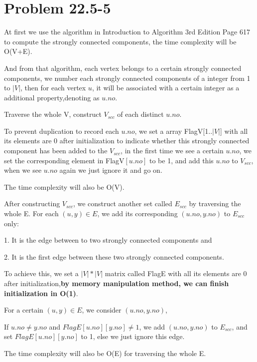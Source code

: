 \documentclass[oneside]{homework} %
\begin{document}
\section {Problem 22.5-5} 
At first we use the algorithm in Introduction to Algorithm 3rd Edition Page 617 to compute the strongly connected components, the time complexity will be O(V+E). 

And from that algorithm, each vertex belongs to a certain strongly connected components, we number each strongly connected components of a integer from 1 to $|V|$, then for each vertex $\mathit{u}$, it will be associated with a certain integer as a additional property,denoting as $\mathit{u}.no$. 

Traverse the whole V, construct $V_{scc}$ of each distinct $\mathit{u}.no$. 

To prevent duplication to record each $\mathit{u}.no$, we set a array FlagV[1..$|V|$] with all its elements are 0 after initialization to indicate whether this strongly connected component has been added to the $V_{scc}$, in the first time we see a certain $\mathit{u}.no$, we set the corresponding element in FlagV$[\mathit{u}.no]$ to be 1, and add this $\mathit{u}.no$ to $V_{scc}$, when we see $\mathit{u}.no$ again we just ignore it and go on.

The time complexity will also be O(V).

After constructing $V_{scc}$, we construct another set called $E_{scc}$ by traversing the whole E. For each $(\mathit{u},\mathit{y}) \in E$, we add its corresponding $(\mathit{u}.no,\mathit{y}.no)$ to $E_{scc}$ only:

1. It is the edge between to two strongly connected components and 

2. It is the first edge between these two strongly connected components.

To achieve this, we set a $|V|*|V|$ matrix called FlagE with all its elements are 0 after initialization,\textbf{by memory manipulation method, we can finish initialization in O(1)}. 

For a certain $(\mathit{u},\mathit{y}) \in E$, we consider $(\mathit{u}.no,\mathit{y}.no)$, 

If $\mathit{u}.no \neq \mathit{y}.no$ and $FlagE[\mathit{u}.no][\mathit{y}.no] \neq 1$, we add $(\mathit{u}.no,\mathit{y}.no)$ to $E_{scc}$, and set $FlagE[\mathit{u}.no][\mathit{y}.no]$ to 1, else we just ignore this edge.

The time complexity will also be O(E) for traversing the whole E.
\end{document}

